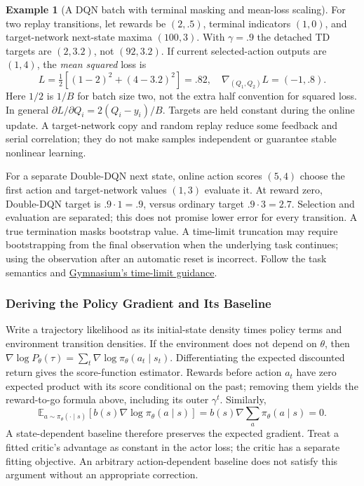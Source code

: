 \documentclass[11pt,twoside]{article}
\numberwithin{equation}{section}
\newcommand{\E}{\mathbb{E}}
\theoremstyle{plain}
\theoremstyle{definition}
\newtheorem{example}[theorem]{Example}
\theoremstyle{remark}
\begin{document}
\begin{example}[A DQN batch with terminal masking and mean-loss scaling]
For two replay transitions, let rewards be $(2,.5)$, terminal indicators $(1,0)$,
and target-network next-state maxima $(100,3)$. With $\gamma=.9$ the detached
TD targets are $(2,3.2)$, not $(92,3.2)$. If current selected-action outputs
are $(1,4)$, the \emph{mean squared} loss is
\[
L=\tfrac12[(1-2)^2+(4-3.2)^2]=.82,\quad
\nabla_{(Q_1,Q_2)}L=(-1,.8).
\]
Here $1/2$ is $1/B$ for batch size two, not the extra half convention for
squared loss. In general $\partial L/\partial Q_i=2(Q_i-y_i)/B$.
Targets are held constant during the online update. A target-network copy and
random replay reduce some feedback and serial correlation; they do not make
samples independent or guarantee stable nonlinear learning.

For a separate Double-DQN next state, online action scores $(5,4)$ choose the
first action and target-network values $(1,3)$ evaluate it. At reward zero,
Double-DQN target is $.9\cdot1=.9$, versus ordinary target $.9\cdot3=2.7$.
Selection and evaluation are separated; this does not promise lower error for
every transition. A true termination masks bootstrap value. A time-limit
truncation may require bootstrapping from the final observation when the
underlying task continues; using the observation after an automatic reset is
incorrect. Follow the task semantics and
\href{https://gymnasium.farama.org/tutorials/gymnasium_basics/handling_time_limits/}{Gymnasium's time-limit guidance}.
\end{example}

\subsubsection{Deriving the Policy Gradient and Its Baseline}
Write a trajectory likelihood as its initial-state density times policy terms
and environment transition densities. If the environment does not depend on
$\theta$, then $\nabla\log P_\theta(\tau)=\sum_t\nabla\log\pi_\theta(a_t\mid s_t)$.
Differentiating the expected discounted return gives the score-function
estimator. Rewards before action $a_t$ have zero expected product with its
score conditional on the past; removing them yields the reward-to-go formula
above, including its outer $\gamma^t$. Similarly,
\[
\E_{a\sim\pi_\theta(\cdot\mid s)}
 [b(s)\nabla\log\pi_\theta(a\mid s)]
 =b(s)\nabla\sum_a\pi_\theta(a\mid s)=0.
\]
A state-dependent baseline therefore preserves the expected gradient.
Treat a fitted critic's advantage as constant in the actor loss; the critic
has a separate fitting objective. An arbitrary action-dependent baseline
does not satisfy this argument without an appropriate correction.
\end{document}
